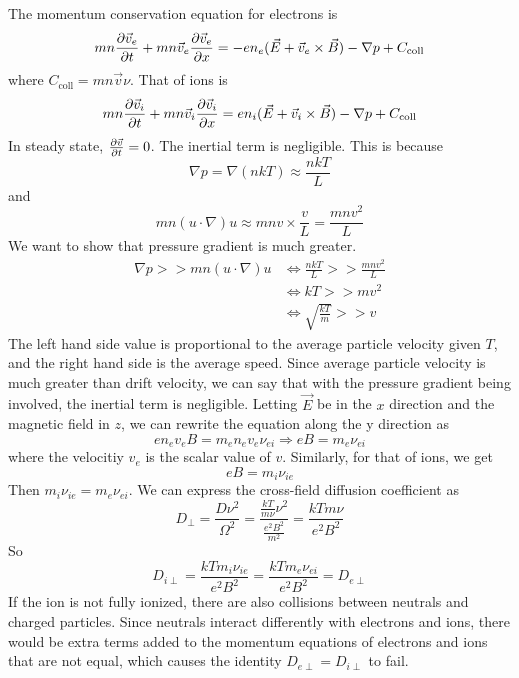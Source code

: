 \documentclass[answers]{exam}
\begin{document}
\begin{questions}
\begin{solution}
    The momentum conservation equation for electrons is
    $$mn\frac{\partial \vec v_e}{\partial t} + mn\vec v_e\frac{\partial \vec v_e}{\partial x} = -en_e(\vec E + \vec v_e \times \vec B) - \nabla p + C_{\text{coll}}$$
    where $C_{\text{coll}} = mn\vec v\nu$. That of ions is
    $$mn\frac{\partial \vec v_i}{\partial t} + mn\vec v_i\frac{\partial \vec v_i}{\partial x} = en_i(\vec E + \vec v_i \times \vec B) - \nabla p + C_{\text{coll}}$$
    In steady state, $\frac{\partial \vec v}{\partial t} = 0$. The inertial term is negligible. This is because
    $$\nabla p = \nabla (nkT) \approx \frac{nkT}{L}$$
    and
    $$mn(u\cdot\nabla)u \approx mnv \times \frac{v}{L} = \frac{mnv^2}{L}$$
    We want to show that pressure gradient is much greater.
    \begin{align*}
        \nabla p >> mn(u\cdot\nabla)u &\Leftrightarrow \frac{nkT}{L} >> \frac{mnv^2}{L} \\
                                      &\Leftrightarrow kT >> mv^2 \\
                                      &\Leftrightarrow \sqrt{\frac{kT}{m}} >> v
    \end{align*}
    The left hand side value is proportional to the average particle velocity given $T$, and the right hand side is the average speed. Since average particle velocity is much greater than drift velocity, we can say that with the pressure gradient being involved, the inertial term is negligible. Letting $\vec E$ be in the $x$ direction and the magnetic field in $z$, we can rewrite the equation along the y direction as
    $$en_ev_eB = m_en_ev_e\nu_{ei} \Rightarrow eB = m_e\nu_{ei}$$
    where the velocitiy $v_e$ is the scalar value of $v$. Similarly, for that of ions, we get
    $$eB = m_i\nu_{ie}$$
    Then $m_i\nu_{ie} = m_e\nu_{ei}$. We can express the cross-field diffusion coefficient as
    $$D_\perp = \frac{D\nu^2}{\Omega^2} = \frac{\frac{kT}{m\nu}\nu^2}{\frac{e^2B^2}{m^2}} = \frac{kTm\nu}{e^2B^2}$$
    So
    $$D_{i\perp} = \frac{kTm_i\nu_{ie}}{e^2B^2} = \frac{kTm_e\nu_{ei}}{e^2B^2} = D_{e\perp}$$
    If the ion is not fully ionized, there are also collisions between neutrals and charged particles. Since neutrals interact differently with electrons and ions, there would be extra terms added to the momentum equations of electrons and ions that are not equal, which causes the identity $D_{e\perp} = D_{i\perp}$ to fail.
\end{solution}




\end{questions}
\end{document}
